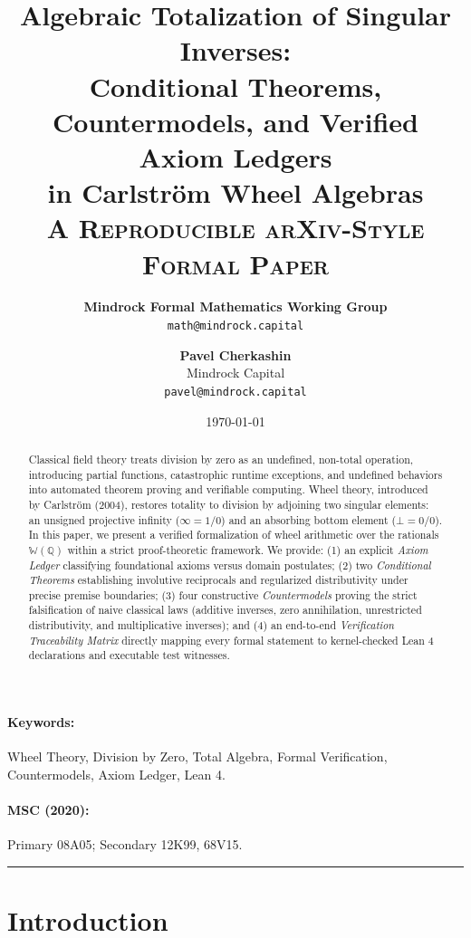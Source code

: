 \documentclass[11pt,a4paper]{article}
\title{\textbf{Algebraic Totalization of Singular Inverses:\\Conditional Theorems, Countermodels, and Verified Axiom Ledgers\\in Carlström Wheel Algebras}\\[0.5ex]
\large \textsc{A Reproducible arXiv-Style Formal Paper}}
\author{
    \textbf{Mindrock Formal Mathematics Working Group}\\
    \texttt{math@mindrock.capital}
    \and
    \textbf{Pavel Cherkashin}\\
    Mindrock Capital\\
    \texttt{pavel@mindrock.capital}
}
\date{\today}
\theoremstyle{plain}
\theoremstyle{definition}
\theoremstyle{remark}
\newcommand{\W}{\mathbb{W}}
\newcommand{\Q}{\mathbb{Q}}
\newcommand{\bott}{\bot}
\newcommand{\inft}{\infty}
\begin{document}
\maketitle

\begin{abstract}
\noindent
Classical field theory treats division by zero as an undefined, non-total operation, introducing partial functions, catastrophic runtime exceptions, and undefined behaviors into automated theorem proving and verifiable computing. Wheel theory, introduced by Carlström (2004), restores totality to division by adjoining two singular elements: an unsigned projective infinity ($\inft = 1/0$) and an absorbing bottom element ($\bott = 0/0$). In this paper, we present a verified formalization of wheel arithmetic over the rationals $\W(\Q)$ within a strict proof-theoretic framework. We provide: (1) an explicit \textit{Axiom Ledger} classifying foundational axioms versus domain postulates; (2) two \textit{Conditional Theorems} establishing involutive reciprocals and regularized distributivity under precise premise boundaries; (3) four constructive \textit{Countermodels} proving the strict falsification of naive classical laws (additive inverses, zero annihilation, unrestricted distributivity, and multiplicative inverses); and (4) an end-to-end \textit{Verification Traceability Matrix} directly mapping every formal statement to kernel-checked Lean 4 declarations and executable test witnesses.
\end{abstract}

\paragraph{Keywords:} Wheel Theory, Division by Zero, Total Algebra, Formal Verification, Countermodels, Axiom Ledger, Lean 4.
\paragraph{MSC (2020):} Primary 08A05; Secondary 12K99, 68V15.

\vspace{1em}
\hrule
\vspace{1em}

\section{Introduction}
\label{sec:intro}
\end{document}
